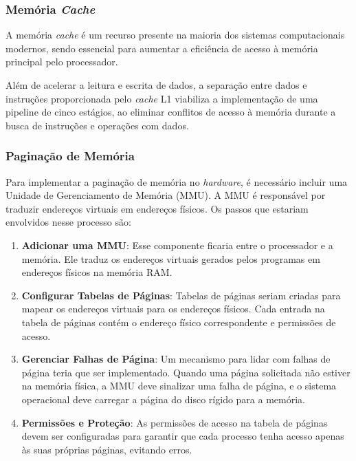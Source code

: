 \documentclass[
	12pt,				%
	openright,			%
	oneside,			%
	a4paper,			%
	english,			%
	french,				%
	spanish,			%
	brazil,				%
	]{abntex2}
\begin{document}
\subsubsection{Memória \textit{Cache}}\label{recursos_cache}%

A memória \textit{cache} é um recurso presente na maioria dos sistemas computacionais modernos, sendo essencial para aumentar a eficiência de acesso à memória principal pelo processador.

Além de acelerar a leitura e escrita de dados, a separação entre dados e instruções proporcionada pelo \textit{cache} L1 viabiliza a implementação de uma pipeline de cinco estágios, ao eliminar conflitos de acesso à memória durante a busca de instruções e operações com dados.

\subsubsection{Paginação de Memória}\label{recursos_mem_pag}%

Para implementar a paginação de memória no \textit{hardware}, é necessário incluir uma Unidade de Gerenciamento de Memória (MMU). A MMU é responsável por traduzir endereços virtuais em endereços físicos. Os passos que estariam envolvidos nesse processo são:

\begin{enumerate}
    \item \textbf{Adicionar uma MMU}: Esse componente ficaria entre o processador e a memória. Ele traduz os endereços virtuais gerados pelos programas em endereços físicos na memória RAM.
    \item \textbf{Configurar Tabelas de Páginas}: Tabelas de páginas seriam criadas para mapear os endereços virtuais para os endereços físicos. Cada entrada na tabela de páginas contém o endereço físico correspondente e permissões de acesso.
    \item \textbf{Gerenciar Falhas de Página}: Um mecanismo para lidar com falhas de página teria que ser implementado. Quando uma página solicitada não estiver na memória física, a MMU deve sinalizar uma falha de página, e o sistema operacional deve carregar a página do disco rígido para a memória.
    \item \textbf{Permissões e Proteção}: As permissões de acesso na tabela de páginas devem ser configuradas para garantir que cada processo tenha acesso apenas às suas próprias páginas, evitando erros.
\end{enumerate}
\end{document}
